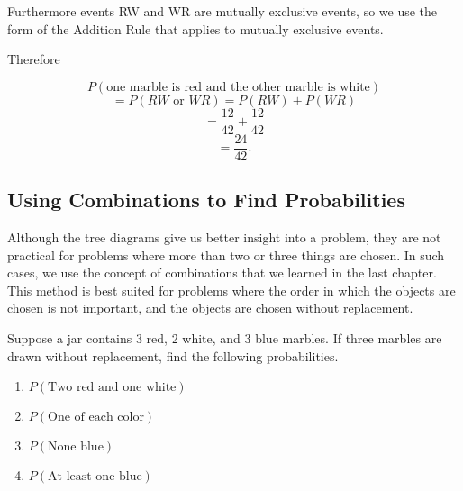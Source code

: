 \begin{solution}
\begin{enumerate}
              Furthermore events RW and WR are mutually exclusive events, so we use the form of the Addition Rule that applies to mutually exclusive events.

              Therefore

              \[
                  P(\text{one marble is red and the other marble is white})
              \]
              \[
                  = P(RW \text{ or } WR) = P(RW) + P(WR)
              \]
              \[
                  = \frac{12}{42} + \frac{12}{42}
              \]
              \[
                  = \frac{24}{42}.
              \]

    \end{enumerate}
\end{solution}

\subsection{Using Combinations to Find Probabilities}
Although the tree diagrams give us better insight into a problem, they are not practical for problems where more than two or three things are chosen.  In such cases, we use the concept of combinations that we learned in the last chapter.   This method is best suited for problems where the order in which the objects are chosen is not important, and the objects are chosen without replacement.


\begin{example}
    Suppose a jar contains 3 red, 2 white, and 3 blue marbles. If three marbles are drawn without replacement, find the following probabilities.
    \begin{enumerate}
        \item \( P(\text{Two red and one white}) \)
        \item \( P(\text{One of each color}) \)
        \item \( P(\text{None blue}) \)
        \item \( P(\text{At least one blue}) \)
    \end{enumerate}
\end{example}

